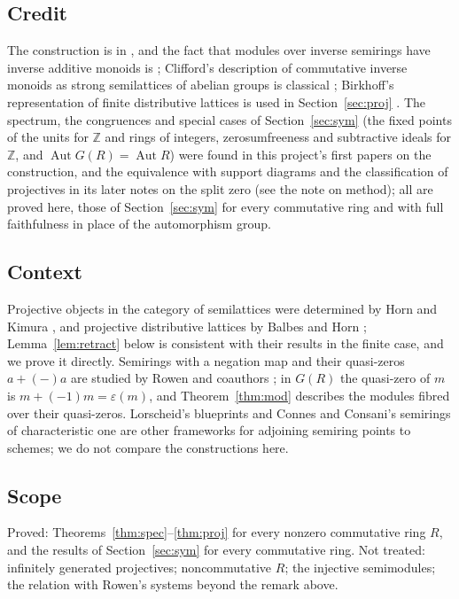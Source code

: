 \documentclass[11pt]{amsart}
\theoremstyle{remark}
\begin{document}
\subsection{Credit}
The construction is in \cite[Definition 3.6]{FGJM}, and the fact that modules over inverse semirings have inverse additive monoids is \cite[Proposition 6.1]{FGJM}; Clifford's description of commutative inverse monoids as strong semilattices of abelian groups is classical \cite{Clifford,Howie}; Birkhoff's representation of finite distributive lattices is used in Section~\ref{sec:proj} \cite{Birkhoff}. The spectrum, the congruences and special cases of Section~\ref{sec:sym} (the fixed points of the units for $\mathbb Z$ and rings of integers, zerosumfreeness and subtractive ideals for $\mathbb Z$, and $\operatorname{Aut}G(R)=\operatorname{Aut}R$) were found in this project's first papers on the construction, and the equivalence with support diagrams and the classification of projectives in its later notes on the split zero (see the note on method); all are proved here, those of Section~\ref{sec:sym} for every commutative ring and with full faithfulness in place of the automorphism group.

\subsection{Context}
Projective objects in the category of semilattices were determined by Horn and Kimura \cite{HK}, and projective distributive lattices by Balbes and Horn \cite{BH}; Lemma~\ref{lem:retract} below is consistent with their results in the finite case, and we prove it directly. Semirings with a negation map and their quasi-zeros $a+(-)a$ are studied by Rowen and coauthors \cite{Rowen}; in $G(R)$ the quasi-zero of $m$ is $m+(-1)m=\varepsilon(m)$, and Theorem~\ref{thm:mod} describes the modules fibred over their quasi-zeros. Lorscheid's blueprints and Connes and Consani's semirings of characteristic one are other frameworks for adjoining semiring points to schemes; we do not compare the constructions here.

\subsection{Scope}
Proved: Theorems~\ref{thm:spec}--\ref{thm:proj} for every nonzero commutative ring $R$, and the results of Section~\ref{sec:sym} for every commutative ring. Not treated: infinitely generated projectives; noncommutative $R$; the injective semimodules; the relation with Rowen's systems beyond the remark above.
\end{document}
